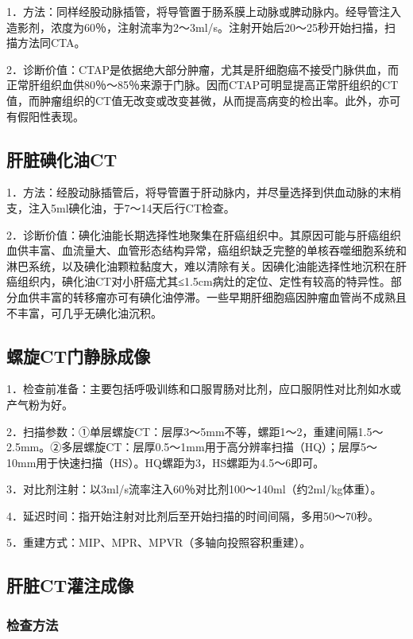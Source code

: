 1．方法：同样经股动脉插管，将导管置于肠系膜上动脉或脾动脉内。经导管注入造影剂，浓度为60％，注射流率为2～3ml/s。注射开始后20～25秒开始扫描，扫描方法同CTA。

2．诊断价值：CTAP是依据绝大部分肿瘤，尤其是肝细胞癌不接受门脉供血，而正常肝组织血供80％～85％来源于门脉。因而CTAP可明显提高正常肝组织的CT值，而肿瘤组织的CT值无改变或改变甚微，从而提高病变的检出率。此外，亦可有假阳性表现。

\subsection{肝脏碘化油CT}

1．方法：经股动脉插管后，将导管置于肝动脉内，并尽量选择到供血动脉的末梢支，注入5ml碘化油，于7～14天后行CT检查。

2．诊断价值：碘化油能长期选择性地聚集在肝癌组织中。其原因可能与肝癌组织血供丰富、血流量大、血管形态结构异常，癌组织缺乏完整的单核吞噬细胞系统和淋巴系统，以及碘化油颗粒黏度大，难以清除有关。因碘化油能选择性地沉积在肝癌组织内，碘化油CT对小肝癌尤其≤1.5cm病灶的定位、定性有较高的特异性。部分血供丰富的转移瘤亦可有碘化油停滞。一些早期肝细胞癌因肿瘤血管尚不成熟且不丰富，可几乎无碘化油沉积。

\subsection{螺旋CT门静脉成像}

1．检查前准备：主要包括呼吸训练和口服胃肠对比剂，应口服阴性对比剂如水或产气粉为好。

2．扫描参数：①单层螺旋CT：层厚3～5mm不等，螺距1～2，重建间隔1.5～2.5mm。②多层螺旋CT：层厚0.5～1mm用于高分辨率扫描（HQ）；层厚5～10mm用于快速扫描（HS）。HQ螺距为3，HS螺距为4.5～6即可。

3．对比剂注射：以3ml/s流率注入60％对比剂100～140ml（约2ml/kg体重）。

4．延迟时间：指开始注射对比剂后至开始扫描的时间间隔，多用50～70秒。

5．重建方式：MIP、MPR、MPVR（多轴向投照容积重建）。

\subsection{肝脏CT灌注成像}

\subsubsection{检查方法}

